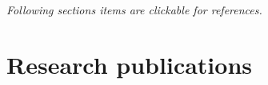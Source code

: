 \documentclass[letterpaper,11pt]{article}
\makeatletter
\newcommand{\resumeSubheading}[4]{
  \vspace{8pt}\item%
    \begin{tabular*}{0.97\textwidth}[t]{l@{\extracolsep{\fill}}r}
      \textbf{#1} & #2 \\
      \textit{\small#3} & \textit{\small #4} \\
    \end{tabular*}\vspace{-5pt}
}
\newcommand{\resumeSubSubheading}[2]{
    \vspace{1pt}
    \begin{tabular*}{0.97\textwidth}{l@{\extracolsep{\fill}}r}
      \textit{\small#1} & \textit{\small #2} \\
    \end{tabular*}\vspace{-5pt}
}
\newcommand{\resumeSubHeadingListStart}{\begin{itemize}[leftmargin=*]}
\newcommand{\resumeSubHeadingListEnd}{\end{itemize}}
\makeatother
\begin{document}
\hfill \textsl{ Following sections items are clickable for references.}

%    
%      
%    
%   
%     
%      
%      
%     
%     
%     




\section{Research publications}
\end{document}
